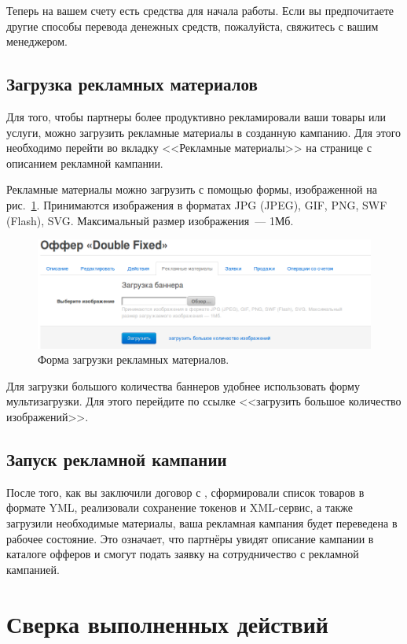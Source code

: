 \documentclass[a4paper,12pt]{article}
\begin{document}
Теперь на вашем счету есть средства для начала работы. Если вы предпочитаете другие способы перевода денежных средств, пожалуйста, свяжитесь с вашим менеджером.

\subsection{Загрузка рекламных материалов}

Для того, чтобы партнеры более продуктивно рекламировали ваши товары или услуги, можно загрузить рекламные материалы в созданную кампанию. Для этого необходимо перейти во вкладку <<Рекламные материалы>> на странице с описанием рекламной кампании.

Рекламные материалы можно загрузить с помощью формы, изображенной на рис.~\ref{fig:materials}. Принимаются изображения в форматах JPG (JPEG), GIF, PNG, SWF (Flash), SVG. Максимальный размер изображения~--- 1Мб.

\begin{figure}[!ht]
\centering
\includegraphics[width=\textwidth]{include/materials.png}
\caption{Форма загрузки рекламных материалов.}
\label{fig:materials}
\end{figure}

Для загрузки большого количества баннеров удобнее использовать форму мультизагрузки. Для этого перейдите по ссылке <<загрузить большое количество изображений>>.

\subsection{Запуск рекламной кампании}

После того, как вы заключили договор с \heymoose{}, сформировали список товаров в формате YML, реализовали сохранение токенов и XML-сервис, а также загрузили необходимые материалы, ваша рекламная кампания будет переведена в рабочее состояние. Это означает, что партнёры увидят описание кампании в каталоге офферов и смогут подать заявку на сотрудничество с рекламной кампанией.

\section{Сверка выполненных действий}
\end{document}
